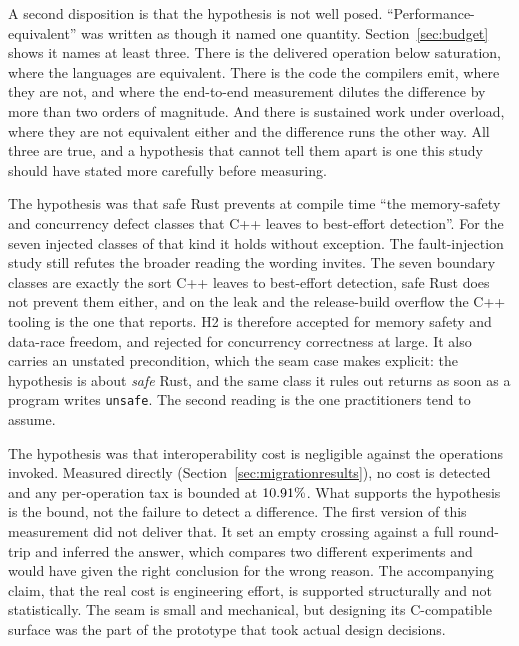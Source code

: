 \documentclass[english,oneside,a4paper,censored,csm,software-track-2020]{HYthesisML}
\begin{document}
\begin{description}
        A second disposition is that the hypothesis is not well posed.
        ``Performance-equivalent'' was written as though it named one quantity.
        Section~\ref{sec:budget} shows it names at least three. There is the delivered operation
        below saturation, where the languages are equivalent. There is the code the compilers
        emit, where they are not, and where the end-to-end measurement dilutes the difference by
        more than two orders of magnitude. And there is sustained work under overload, where they
        are not equivalent either and the difference runs the other way. All three are true, and a
        hypothesis that cannot tell them apart is one this study should have stated more carefully
        before measuring.
  \item[H2: supported in its precise form, refuted in its loose one.] The hypothesis was
        that safe Rust prevents at compile time ``the memory-safety and concurrency defect
        classes that C++ leaves to best-effort detection''. For the seven injected classes of
        that kind it holds without exception. The fault-injection study still refutes
        the broader reading the wording invites. The seven boundary classes are exactly the sort
        C++ leaves to best-effort detection, safe Rust does not prevent them either, and on the
        leak and the release-build overflow the C++ tooling is the one that reports. H2 is
        therefore accepted for memory safety and
        data-race freedom, and rejected for concurrency correctness at large. It also carries an
        unstated precondition, which the seam case makes explicit: the hypothesis is about
        \emph{safe} Rust, and the same class it rules out returns as soon as a program writes
        \texttt{unsafe}. The second reading
        is the one practitioners tend to assume.
  \item[H3: supported, and tested the right way on the second attempt.] The hypothesis was
        that interoperability cost is negligible against the operations invoked. Measured
        directly (Section~\ref{sec:migrationresults}), no cost is detected and any per-operation
        tax is bounded at $10.91\%$. What supports the hypothesis is the bound, not the
        failure to detect a difference. The first version of this measurement did
        not deliver that. It set an empty crossing against a full round-trip and inferred the
        answer, which compares two different experiments and would have given
        the right conclusion for the wrong reason. The accompanying claim, that the real cost
        is engineering effort, is supported structurally and not statistically. The seam is
        small and mechanical, but designing its C-compatible surface was the part of the
        prototype that took actual design decisions.
\end{description}
\end{document}
